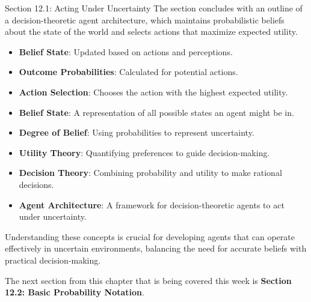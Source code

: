 \begin{notes}{Section 12.1: Acting Under Uncertainty}
    The section concludes with an outline of a decision-theoretic agent architecture, which maintains probabilistic beliefs about the state of the world and selects actions that maximize expected utility.
    
    \begin{highlight}
    
        \begin{itemize}
            \item \textbf{Belief State}: Updated based on actions and perceptions.
            \item \textbf{Outcome Probabilities}: Calculated for potential actions.
            \item \textbf{Action Selection}: Chooses the action with the highest expected utility.
        \end{itemize}
    
    \end{highlight}
    
    \begin{highlight}
    
        \begin{itemize}
            \item \textbf{Belief State}: A representation of all possible states an agent might be in.
            \item \textbf{Degree of Belief}: Using probabilities to represent uncertainty.
            \item \textbf{Utility Theory}: Quantifying preferences to guide decision-making.
            \item \textbf{Decision Theory}: Combining probability and utility to make rational decisions.
            \item \textbf{Agent Architecture}: A framework for decision-theoretic agents to act under uncertainty.
        \end{itemize}
    
        Understanding these concepts is crucial for developing agents that can operate effectively in uncertain environments, balancing the need for accurate beliefs with practical decision-making.
    
    \end{highlight}
\end{notes}

The next section from this chapter that is being covered this week is \textbf{Section 12.2: Basic Probability Notation}.

